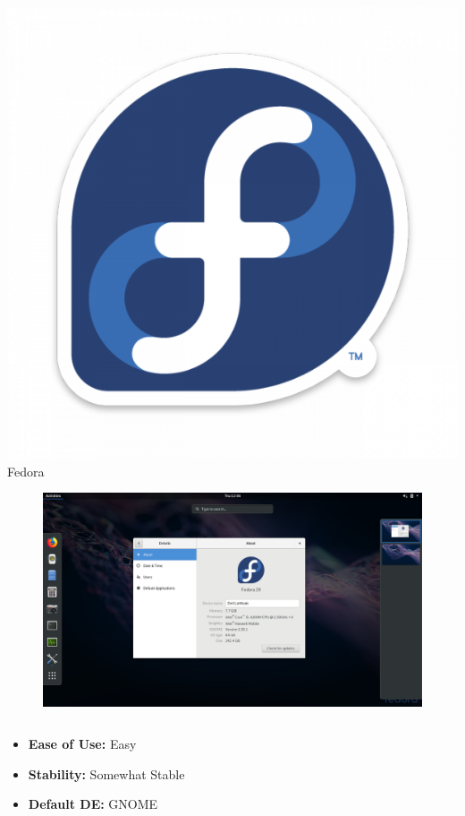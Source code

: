 \documentclass[11pt]{beamer}
\begin{document}
\begin{frame}{\includegraphics[scale=0.03]{fedora-logo.png} Fedora}
	\begin{figure}
		\includegraphics[scale=0.15]{fedora-screenshot.png}
	\end{figure}
	\begin{columns}
		\small
		\begin{column}{0.35\textwidth}
			\begin{itemize}
				\item \textbf{Ease of Use:} Easy
				\item \textbf{Stability:} Somewhat Stable
				\item \textbf{Default DE:} GNOME

\end{itemize}
\end{column}
\end{columns}
\end{frame}
\end{document}
